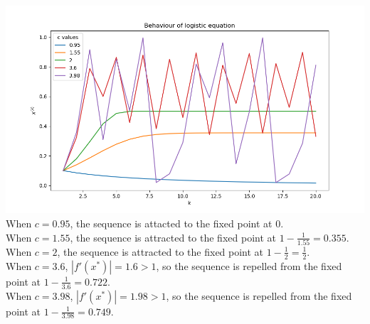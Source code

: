 \documentclass[letterpaper,12pt]{article} %
\begin{document}
\begin{enumerate}
{    \includegraphics[width=\textwidth]{q2logseq}
    When \(c=0.95\), the sequence is attacted to the fixed point at 0.\\
    When \(c=1.55\), the sequence is attracted to the fixed point at \( 1-\frac{1}{1.55} = 0.355 \).\\
    When \(c=2\), the sequence is attracted to the fixed point at \( 1-\frac{1}{2} = \frac{1}{2} \).\\
    When \(c=3.6\), \(|f'(x^*)| = 1.6 > 1 \), so the sequence is repelled from the fixed point at \( 1-\frac{1}{3.6} = 0.722 \).\\
    When \(c=3.98\), \(|f'(x^*)| = 1.98 > 1 \), so the sequence is repelled from the fixed point at \( 1-\frac{1}{3.98} = 0.749 \).
  }

\end{enumerate}

\medskip
\printbibliography
\end{document}
